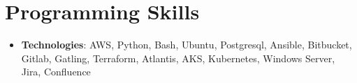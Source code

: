 \documentclass[a4paper]{article}
\newcommand{\resumeSubHeadingListStart}{\begin{itemize}[leftmargin=*]}
\newcommand{\resumeSubHeadingListEnd}{\end{itemize}}
\begin{document}
\section{Programming Skills}
  \resumeSubHeadingListStart
    \item{
      \textbf{Technologies}{: AWS, Python, Bash, Ubuntu, Postgresql, Ansible, Bitbucket, Gitlab, Gatling, Terraform, Atlantis, AKS, Kubernetes, Windows Server, Jira, Confluence}
    }
  \resumeSubHeadingListEnd


\end{document}
